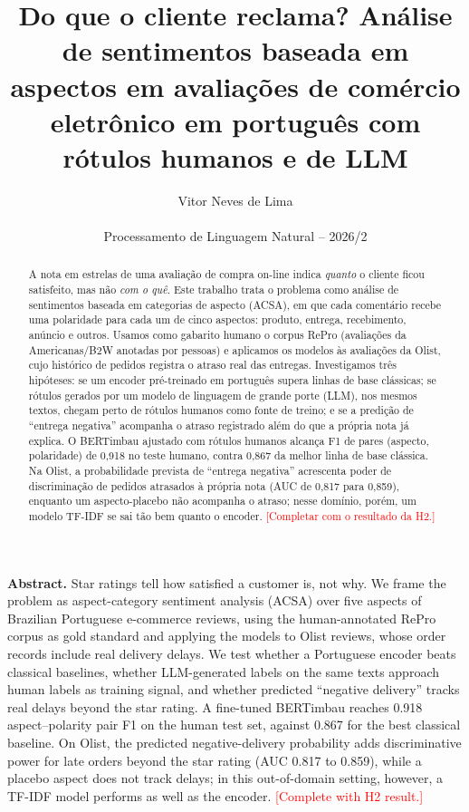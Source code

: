 \documentclass[12pt,a4paper]{article}
\title{Do que o cliente reclama? Análise de sentimentos baseada em aspectos em avaliações de comércio eletrônico em português com rótulos humanos e de LLM}
\author{Vitor Neves de Lima\\
  \small \pendente{Instituição -- Curso}\\
  \small Processamento de Linguagem Natural -- 2026/2}
\date{}
\newcommand{\pendente}[1]{\textcolor{red}{[#1]}}
\begin{document}
\maketitle

\begin{abstract}
A nota em estrelas de uma avaliação de compra on-line indica \emph{quanto} o cliente ficou satisfeito, mas não \emph{com o quê}. Este trabalho trata o problema como análise de sentimentos baseada em categorias de aspecto (ACSA), em que cada comentário recebe uma polaridade para cada um de cinco aspectos: produto, entrega, recebimento, anúncio e outros. Usamos como gabarito humano o corpus RePro (avaliações da Americanas/B2W anotadas por pessoas) e aplicamos os modelos às avaliações da Olist, cujo histórico de pedidos registra o atraso real das entregas. Investigamos três hipóteses: se um encoder pré-treinado em português supera linhas de base clássicas; se rótulos gerados por um modelo de linguagem de grande porte (LLM), nos mesmos textos, chegam perto de rótulos humanos como fonte de treino; e se a predição de ``entrega negativa'' acompanha o atraso registrado além do que a própria nota já explica. O BERTimbau ajustado com rótulos humanos alcança F1 de pares (aspecto, polaridade) de 0,918 no teste humano, contra 0,867 da melhor linha de base clássica. Na Olist, a probabilidade prevista de ``entrega negativa'' acrescenta poder de discriminação de pedidos atrasados à própria nota (AUC de 0,817 para 0,859), enquanto um aspecto-placebo não acompanha o atraso; nesse domínio, porém, um modelo TF-IDF se sai tão bem quanto o encoder. \pendente{Completar com o resultado da H2.}
\end{abstract}

\begin{center}
\begin{minipage}{0.9\textwidth}
\small\textbf{Abstract.} Star ratings tell how satisfied a customer is, not why. We frame the problem as aspect-category sentiment analysis (ACSA) over five aspects of Brazilian Portuguese e-commerce reviews, using the human-annotated RePro corpus as gold standard and applying the models to Olist reviews, whose order records include real delivery delays. We test whether a Portuguese encoder beats classical baselines, whether LLM-generated labels on the same texts approach human labels as training signal, and whether predicted ``negative delivery'' tracks real delays beyond the star rating. A fine-tuned BERTimbau reaches 0.918 aspect--polarity pair F1 on the human test set, against 0.867 for the best classical baseline. On Olist, the predicted negative-delivery probability adds discriminative power for late orders beyond the star rating (AUC 0.817 to 0.859), while a placebo aspect does not track delays; in this out-of-domain setting, however, a TF-IDF model performs as well as the encoder. \pendente{Complete with H2 result.}
\end{minipage}
\end{center}
\end{document}
